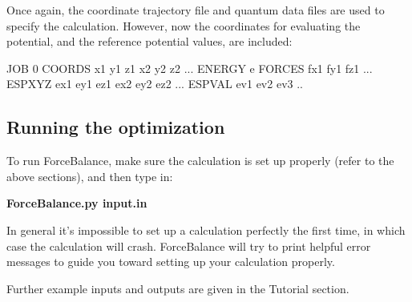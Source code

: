 \-Once again, the coordinate trajectory file and quantum data files are used to specify the calculation. \-However, now the coordinates for evaluating the potential, and the reference potential values, are included\-:

\begin{DoxyVerb}
JOB 0
COORDS x1 y1 z1 x2 y2 z2 ...
ENERGY e
FORCES fx1 fy1 fz1 ...
ESPXYZ ex1 ey1 ez1 ex2 ey2 ez2 ... 
ESPVAL ev1 ev2 ev3 ..
\end{DoxyVerb}
\hypertarget{usage_running_software}{}\subsection{\-Running the optimization}\label{usage_running_software}
\-To run \-Force\-Balance, make sure the calculation is set up properly (refer to the above sections), and then type in\-:

{\bfseries  \-Force\-Balance.\-py input.\-in }

\-In general it's impossible to set up a calculation perfectly the first time, in which case the calculation will crash. \-Force\-Balance will try to print helpful error messages to guide you toward setting up your calculation properly.

\-Further example inputs and outputs are given in the \-Tutorial section. 